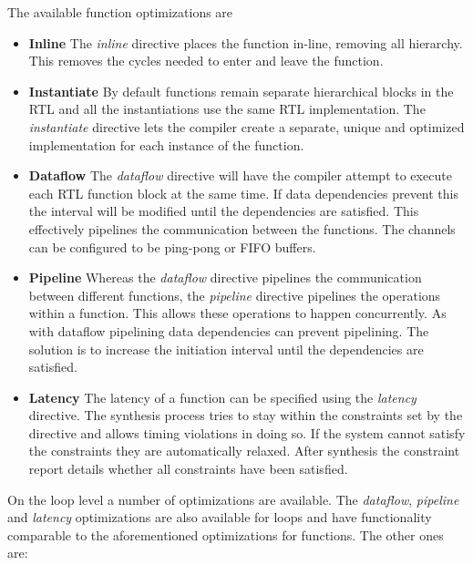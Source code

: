 The available function optimizations are

\begin{itemize}
	
	\item 	\textbf{Inline} The \emph{inline} directive places the function in-line, removing all hierarchy. This removes the cycles needed to enter and leave the function.
	
	\item 	\textbf{Instantiate}  By default functions remain separate hierarchical blocks in the RTL and all the instantiations use the same RTL implementation. The \emph{instantiate} directive lets the compiler create a separate,
	unique and optimized implementation for each instance of the function. 
	
	\item 	\textbf{Dataflow} The \emph{dataflow} directive will have the compiler attempt to execute each RTL function block at the same time. If data dependencies prevent this the interval will be modified until the dependencies are satisfied. This effectively pipelines the communication between the functions. The channels can be configured to be ping-pong or FIFO buffers. 
	
	\item 	\textbf{Pipeline} Whereas the \emph{dataflow} directive pipelines the communication between different functions, the \emph{pipeline} directive pipelines the operations within a function. This allows these operations to happen concurrently. As with dataflow pipelining data dependencies can prevent pipelining. The solution is to increase the initiation interval until the dependencies are satisfied.
	
	\item 	\textbf{Latency} The latency of a function can be specified using the \emph{latency} directive. The synthesis process tries to stay within the constraints set by the directive and allows timing violations in doing so. If the system cannot satisfy the constraints they are automatically relaxed. After synthesis the constraint report details whether all constraints have been satisfied.
\end{itemize}

On the loop level a number of optimizations are available. The \emph{dataflow}, \emph{pipeline} and \emph{latency} optimizations are also available for loops and have functionality comparable to the aforementioned optimizations for functions. The other ones are:

